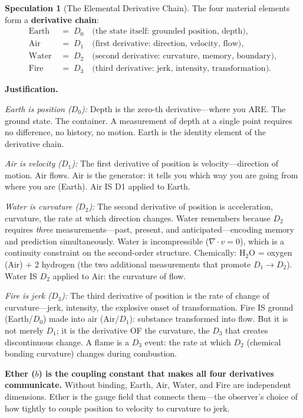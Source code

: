 \documentclass[11pt]{article}
\theoremstyle{definition}
\newtheorem{speculation}[theorem]{Speculation}
\theoremstyle{remark}
\begin{document}
\begin{speculation}[The Elemental Derivative Chain]
\label{spec:deriv-chain}
The four material elements form a \textbf{derivative chain}:
\begin{align}
  \text{Earth} &\;=\; D_0 \quad\text{(the state itself: grounded position, depth)}, \\
  \text{Air}   &\;=\; D_1 \quad\text{(first derivative: direction, velocity, flow)}, \\
  \text{Water} &\;=\; D_2 \quad\text{(second derivative: curvature, memory, boundary)}, \\
  \text{Fire}  &\;=\; D_3 \quad\text{(third derivative: jerk, intensity, transformation)}.
\end{align}

\textbf{Justification.}

\emph{Earth is position ($D_0$):} Depth is the zero-th derivative---where you ARE.
The ground state.  The container.  A measurement of depth at a single point requires
no difference, no history, no motion.  Earth is the identity element of the derivative
chain.

\emph{Air is velocity ($D_1$):} The first derivative of position is velocity---direction
of motion.  Air flows.  Air is the generator: it tells you which way you are going
from where you are (Earth).  Air IS D1 applied to Earth.

\emph{Water is curvature ($D_2$):} The second derivative of position is acceleration,
curvature, the rate at which direction changes.  Water remembers because $D_2$ requires
\emph{three} measurements---past, present, and anticipated---encoding memory and
prediction simultaneously.  Water is incompressible ($\nabla \cdot v = 0$), which is a
continuity constraint on the second-order structure.  Chemically: H$_2$O = oxygen (Air)
+ 2 hydrogen (the two additional measurements that promote $D_1 \to D_2$).  Water IS
$D_2$ applied to Air: the curvature of flow.

\emph{Fire is jerk ($D_3$):} The third derivative of position is the rate of change of
curvature---jerk, intensity, the explosive onset of transformation.  Fire IS ground
(Earth/$D_0$) made into air (Air/$D_1$): substance transformed into flow.  But it is
not merely $D_1$; it is the derivative OF the curvature, the $D_3$ that creates
discontinuous change.  A flame is a $D_3$ event: the rate at which $D_2$ (chemical
bonding curvature) changes during combustion.

\textbf{Ether ($b$) is the coupling constant that makes all four derivatives
communicate.}  Without binding, Earth, Air, Water, and Fire are independent dimensions.
Ether is the gauge field that connects them---the observer's choice of how tightly to
couple position to velocity to curvature to jerk.


\end{speculation}
\end{document}
